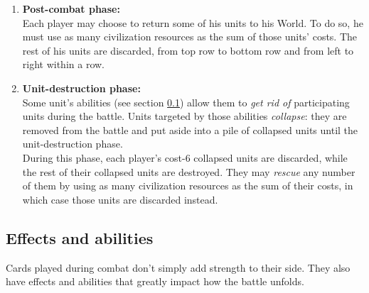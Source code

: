 \documentclass[a4paper]{article}
\begin{document}
\begin{enumerate}
                the defending player adds 1 to the Base Defense of his territories.
                The defending player then replenishes his hand.
                \label{battle7}
            \item \textbf{Post-combat phase:}\\
                Each player may choose to return some of his units to his World.
                To do so, he must use as many civilization resources
                as the sum of those units' costs.
                The rest of his units are discarded,
                from top row to bottom row and from left to right within a row.
            \item \textbf{Unit-destruction phase:}\\
                Some unit's abilities (see section \ref{abilities}) allow them
                to \textit{get rid of} participating units during the battle.
                Units targeted by those abilities \textit{collapse}:
                they are removed from the battle and put aside
                into a pile of collapsed units until the unit-destruction phase.\\
                During this phase, each player's cost-6 collapsed units are discarded,
                while the rest of their collapsed units are destroyed.
                They may \textit{rescue} any number of them by using
                as many civilization resources as the sum of their costs,
                in which case those units are discarded instead.      
        \end{enumerate}

\newpage
    \subsection{Effects and abilities}
        \label{abilities}
        Cards played during combat don't simply add strength to their side.
        They also have effects and abilities that greatly impact how the battle unfolds.
\end{document}
